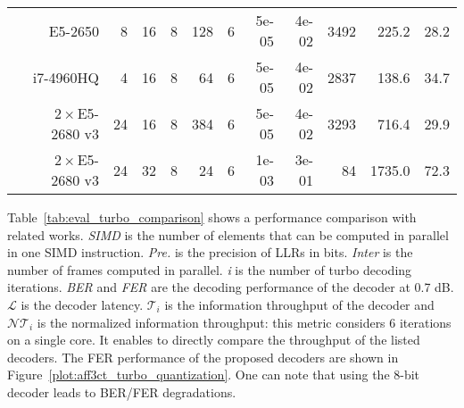 \begin{table}[htp]
{{\begin{tabular}{r r r r r r r r r r r r}
  \cite{Cassagne2016a}              & E5-2650             & 8              & 16            &  8           & 128             & 6        & 5e-05        & 4e-02            &                 3492  &                 225.2  &   28.2                \\
  \cite{Cassagne2016a}              & i7-4960HQ           & 4              & 16            &  8           & 64              & 6        & 5e-05        & 4e-02            &                 2837  &                 138.6  &   34.7                \\
  \cite{Cassagne2016a}              & $2\times$E5-2680 v3 & 24             & 16            &  8           & 384             & 6        & 5e-05        & 4e-02            &                 3293  &                 716.4  &   29.9                \\
  \cite{LeGal2019a}                 & $2\times$E5-2680 v3 & 24             & 32            &  8           & 24              & 6        & 1e-03        & 3e-01            &                   84  &                1735.0  &   72.3                \\
  \end{tabular}
  }}
\end{table}

Table~\ref{tab:eval_turbo_comparison} shows a performance comparison with
related works. \emph{SIMD} is the number of elements that can be computed in
parallel in one SIMD instruction. \emph{Pre.} is the precision of LLRs in bits.
\emph{Inter} is the number of frames computed in parallel. \emph{i} is the
number of turbo decoding iterations. \emph{BER} and \emph{FER} are the decoding
performance of the decoder at 0.7 dB. $\mathcal{L}$ is the decoder latency.
$\mathcal{T}_i$ is the information throughput of the decoder and
$\mathcal{NT}_i$ is the normalized information throughput: this metric considers
6 iterations on a single core. It enables to directly compare the throughput of
the listed decoders. The FER performance of the proposed decoders are shown in
Figure~\ref{plot:aff3ct_turbo_quantization}. One can note that using the 8-bit
decoder leads to BER/FER degradations.

